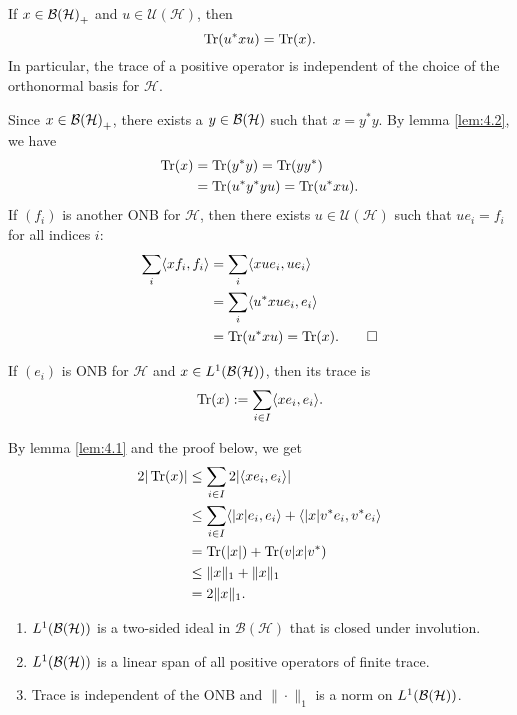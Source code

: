 \begin{corollary}
  If $x \in \operatorname{\mathcal{B} (\mathcal{H})}_+$ and $u \in \mathcal{U} (\mathcal{H})$, then 
  $$\operatorname{Tr} (u^* x u) = \operatorname{Tr} (x).$$
  In particular, the trace of a positive operator is independent of the choice of the 
  orthonormal basis for $\mathcal{H}$.
\end{corollary}

\begin{myproof}
  Since $x \in \operatorname{\mathcal{B} (\mathcal{H})}_+$, there exists a $y \in \operatorname{\mathcal{B} (\mathcal{H})}$
  such that $x = y^* y$. By lemma \ref{lem:4.2}, we have 
  \begin{align*}
    \operatorname{Tr} (x) &= \operatorname{Tr} (y^* y) = \operatorname{Tr} (y y^*)\\
    &= \operatorname{Tr} (u^* y^* y u) = \operatorname{Tr} (u^* x u).
  \end{align*}
  If $(f_i)$ is another ONB for $\mathcal{H}$, then there exists $u \in \mathcal{U}(\mathcal{H})$ such that $u e_i = f_i$ for all indices $i$:
  \begin{align*}
    \sum_i \langle x f_i, f_i \rangle &= \sum_i \langle x u e_i, u e_i\rangle\\
    &= \sum_i \langle u^* x u e_i, e_i \rangle\\
    &= \operatorname{Tr} (u^* x u) = \operatorname{Tr} (x). \qedhere
  \end{align*}
\end{myproof}

\begin{definition}
  If $(e_i)$ is ONB for $\mathcal{H}$ and $x \in L^1 (\operatorname{\mathcal{B} (\mathcal{H})})$, then its trace is 
  $$\operatorname{Tr}(x) := \sum_{i \in I} \langle x e_i, e_i \rangle.$$
\end{definition}

By lemma \ref{lem:4.1} and the proof below, we get
\begin{align*}
  2 | \operatorname{Tr}(x) | &\leq \sum_{i \in I} 2|\langle xe_i, e_i\rangle|\\
  &\leq \sum_{i \in I} \langle |x|e_i, e_i\rangle + \langle |x| v^* e_i, v^* e_i\rangle\\
  &= \operatorname{Tr} (|x|) + \operatorname{Tr} (v |x| v^*) \\
  &\leq \|x\|_1 + \|x\|_1\\
  &= 2\| x\|_1.
\end{align*}

\begin{theorem}
  \begin{enumerate}
    \item $L^1 (\operatorname{\mathcal{B} (\mathcal{H})})$ is a two-sided ideal in $\mathcal{B}(\mathcal{H})$
    that is closed under involution. 
    \item $L^1 (\operatorname{\mathcal{B} (\mathcal{H})})$ is a linear span of all positive operators of finite trace.
    \item Trace is independent of the ONB and $\| \cdot \|_1$ is a norm on $L^1 (\operatorname{\mathcal{B} (\mathcal{H})})$.
  \end{enumerate}
\end{theorem}

